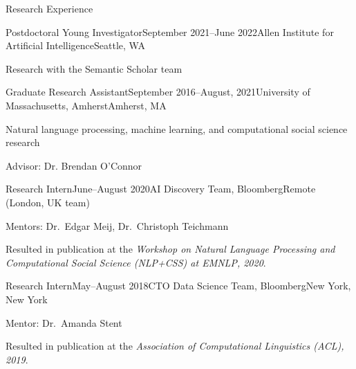 \documentclass{resume} %
\begin{document}
\begin{rSection}{Research Experience}

\begin{rSubsection}{Postdoctoral Young Investigator}{September 2021--June 2022}{Allen Institute for Artificial Intelligence}{Seattle, WA}
\item Research with the Semantic Scholar team
\end{rSubsection}

\begin{rSubsection}{Graduate Research Assistant}{September 2016--August, 2021}{University of Massachusetts, Amherst}{Amherst, MA}
\item Natural language processing, machine learning, and computational social science research
\item Advisor: Dr. Brendan O'Connor 
\end{rSubsection}

\begin{rSubsection}{Research Intern}{June--August 2020}{AI Discovery Team, Bloomberg}{Remote (London, UK team)}
\item Mentors: Dr.~Edgar Meij, Dr.~Christoph Teichmann
\item Resulted in publication at the \emph{Workshop on Natural Language Processing and Computational Social Science (NLP+CSS) at EMNLP, 2020}.
\end{rSubsection}

\begin{rSubsection}{Research Intern}{May--August 2018}{CTO Data Science Team, Bloomberg}{New York, New York}
\item Mentor: Dr.~Amanda Stent
\item Resulted in publication at the \emph{Association of Computational Linguistics (ACL), 2019}.
\end{rSubsection}



\end{rSection}
\end{document}
